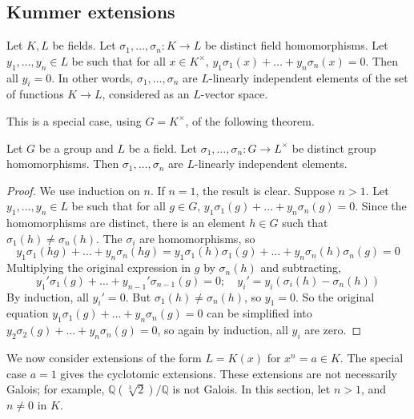 \subsection{Kummer extensions}
\begin{theorem}
	Let \( K, L \) be fields.
	Let \( \sigma_1, \dots, \sigma_n \colon K \to L \) be distinct field homomorphisms.
	Let \( y_1, \dots, y_n \in L \) be such that for all \( x \in K^\times \), \( y_1 \sigma_1(x) + \dots + y_n \sigma_n(x) = 0 \).
	Then all \( y_i = 0 \).
	In other words, \( \sigma_1, \dots, \sigma_n \) are \( L \)-linearly independent elements of the set of functions \( K \to L \), considered as an \( L \)-vector space.
\end{theorem}
This is a special case, using \( G = K^\times \), of the following theorem.
\begin{theorem}
	Let \( G \) be a group and \( L \) be a field.
	Let \( \sigma_1, \dots, \sigma_n \colon G \to L^\times \) be distinct group homomorphisms.
	Then \( \sigma_1, \dots, \sigma_n \) are \( L \)-linearly independent elements.
\end{theorem}
\begin{proof}
	We use induction on \( n \).
	If \( n = 1 \), the result is clear.
	Suppose \( n > 1 \).
	Let \( y_1, \dots, y_n \in L \) be such that for all \( g \in G \), \( y_1 \sigma_1(g) + \dots + y_n \sigma_n(g) = 0 \).
	Since the homomorphisms are distinct, there is an element \( h \in G \) such that \( \sigma_1(h) \neq \sigma_n(h) \).
	The \( \sigma_i \) are homomorphisms, so
	\[ y_1 \sigma_1(hg) + \dots + y_n \sigma_n(hg) = y_1 \sigma_1(h)\sigma_1(g) + \dots + y_n \sigma_n(h)\sigma_n(g) = 0 \]
	Multiplying the original expression in \( g \) by \( \sigma_n(h) \) and subtracting,
	\[ y_1' \sigma_1(g) + \dots + y_{n-1}'\sigma_{n-1}(g) = 0;\quad y_i' = y_i(\sigma_i(h) - \sigma_n(h)) \]
	By induction, all \( y_i' = 0 \).
	But \( \sigma_1(h) \neq \sigma_n(h) \), so \( y_1 = 0 \).
	So the original equation \( y_1\sigma_1(g) + \dots + y_n\sigma_n(g) = 0 \) can be simplified into \( y_2\sigma_2(g) + \dots + y_n\sigma_n(g) = 0 \), so again by induction, all \( y_i \) are zero.
\end{proof}
We now consider extensions of the form \( L = K(x) \) for \( x^n = a \in K \).
The special case \( a = 1 \) gives the cyclotomic extensions.
These extensions are not necessarily Galois; for example, \( \mathbb Q(\sqrt[3]{2}) / \mathbb Q \) is not Galois.
In this section, let \( n > 1 \), and \( n \neq 0 \) in \( K \).
